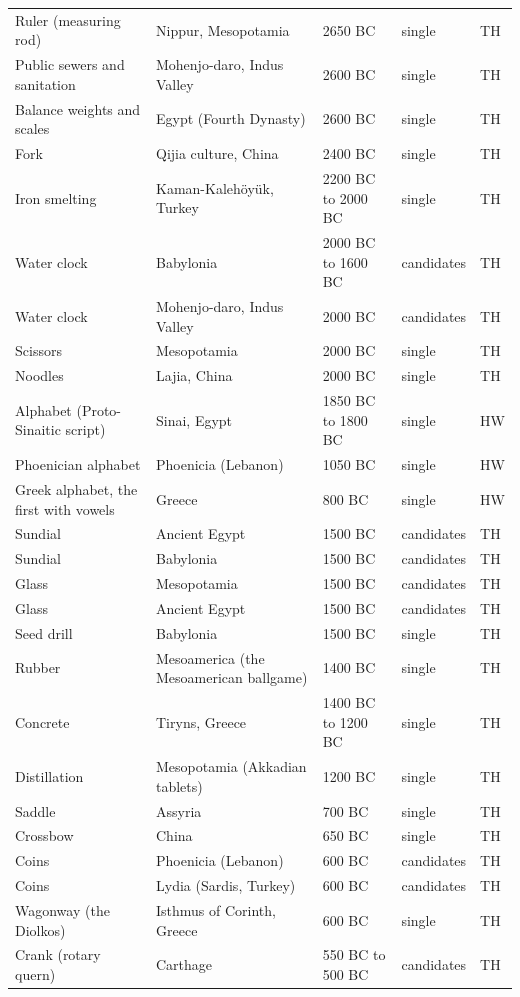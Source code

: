 \documentclass[11pt,a4paper]{article}
\begin{document}
\begin{longtable}{p{3.3cm}p{5.2cm}p{3.3cm}p{1.7cm}l}
Ruler (measuring rod) & Nippur, Mesopotamia & 2650 BC & single & TH\\
Public sewers and sanitation & Mohenjo-daro, Indus Valley & 2600 BC & single & TH\\
Balance weights and scales & Egypt (Fourth Dynasty) & 2600 BC & single & TH\\
Fork & Qijia culture, China & 2400 BC & single & TH\\
Iron smelting & Kaman-Kalehöyük, Turkey & 2200 BC to 2000 BC & single & TH\\
Water clock & Babylonia & 2000 BC to 1600 BC & candidates & TH\\
Water clock & Mohenjo-daro, Indus Valley & 2000 BC & candidates & TH\\
Scissors & Mesopotamia & 2000 BC & single & TH\\
Noodles & Lajia, China & 2000 BC & single & TH\\
Alphabet (Proto-Sinaitic script) & Sinai, Egypt & 1850 BC to 1800 BC & single & HW\\
Phoenician alphabet & Phoenicia (Lebanon) & 1050 BC & single & HW\\
Greek alphabet, the first with vowels & Greece & 800 BC & single & HW\\
Sundial & Ancient Egypt & 1500 BC & candidates & TH\\
Sundial & Babylonia & 1500 BC & candidates & TH\\
Glass & Mesopotamia & 1500 BC & candidates & TH\\
Glass & Ancient Egypt & 1500 BC & candidates & TH\\
Seed drill & Babylonia & 1500 BC & single & TH\\
Rubber & Mesoamerica (the Mesoamerican ballgame) & 1400 BC & single & TH\\
Concrete & Tiryns, Greece & 1400 BC to 1200 BC & single & TH\\
Distillation & Mesopotamia (Akkadian tablets) & 1200 BC & single & TH\\
Saddle & Assyria & 700 BC & single & TH\\
Crossbow & China & 650 BC & single & TH\\
Coins & Phoenicia (Lebanon) & 600 BC & candidates & TH\\
Coins & Lydia (Sardis, Turkey) & 600 BC & candidates & TH\\
Wagonway (the Diolkos) & Isthmus of Corinth, Greece & 600 BC & single & TH\\
Crank (rotary quern) & Carthage & 550 BC to 500 BC & candidates & TH\\

\end{longtable}
\end{document}
